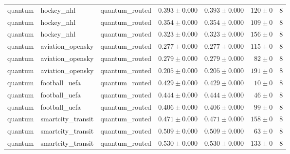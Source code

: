 \begin{table}[htbp]
\begin{tabular}{l l l r r r r}
quantum & hockey\_nhl & quantum\_routed & $0.393\pm0.000$ & $0.393\pm0.000$ & $120\pm0$ & 8 \\
quantum & hockey\_nhl & quantum\_routed & $0.354\pm0.000$ & $0.354\pm0.000$ & $109\pm0$ & 8 \\
quantum & hockey\_nhl & quantum\_routed & $0.323\pm0.000$ & $0.323\pm0.000$ & $156\pm0$ & 8 \\
quantum & aviation\_opensky & quantum\_routed & $0.277\pm0.000$ & $0.277\pm0.000$ & $115\pm0$ & 8 \\
quantum & aviation\_opensky & quantum\_routed & $0.279\pm0.000$ & $0.279\pm0.000$ & $82\pm0$ & 8 \\
quantum & aviation\_opensky & quantum\_routed & $0.205\pm0.000$ & $0.205\pm0.000$ & $191\pm0$ & 8 \\
quantum & football\_uefa & quantum\_routed & $0.429\pm0.000$ & $0.429\pm0.000$ & $10\pm0$ & 8 \\
quantum & football\_uefa & quantum\_routed & $0.444\pm0.000$ & $0.444\pm0.000$ & $46\pm0$ & 8 \\
quantum & football\_uefa & quantum\_routed & $0.406\pm0.000$ & $0.406\pm0.000$ & $99\pm0$ & 8 \\
quantum & smartcity\_transit & quantum\_routed & $0.471\pm0.000$ & $0.471\pm0.000$ & $158\pm0$ & 8 \\
quantum & smartcity\_transit & quantum\_routed & $0.509\pm0.000$ & $0.509\pm0.000$ & $63\pm0$ & 8 \\
quantum & smartcity\_transit & quantum\_routed & $0.530\pm0.000$ & $0.530\pm0.000$ & $133\pm0$ & 8 \\
\hline
\end{tabular}
\end{table}
